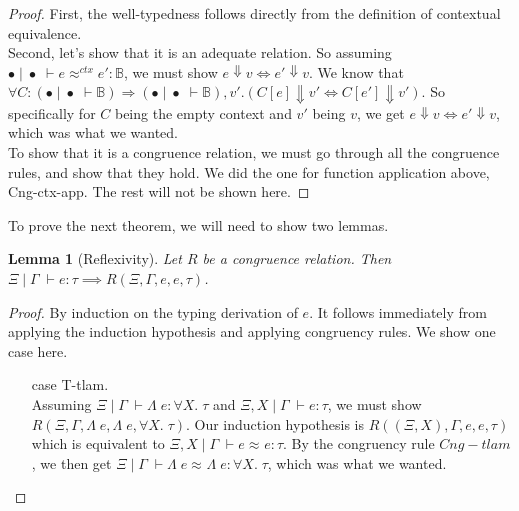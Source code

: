 \documentclass[twoside,11pt,openright]{report}
\newtheorem{lemma}[theorem]{Lemma}
\theoremstyle{definition}
\newcommand{\expr}{e}
\newcommand{\val}{v}
\newcommand{\Tvar}{X}
\newcommand{\Tlam}{\Lambda\;}
\newcommand{\ctx}{C}
\newcommand{\Tbool}{\mathbb{B}}
\newcommand{\Tall}[2]{\forall #1.\; #2}
\newcommand{\typ}{\tau}
\newcommand{\venv}{\Gamma}
\newcommand{\tenv}{\Xi}
\newcommand{\emptenv}{\bullet}
\newcommand{\empvenv}{\bullet}
\newcommand{\jdg}[4]{#1 \; | \; #2 \; \vdash #3 : #4}
\newcommand{\jdgType}[3]{#1 \; | \; #2 \; \vdash #3}
\newcommand{\jdgRel}[6]{#1 \; | \; #2 \; \vdash #3 \approx^{#4} #5 : #6}
\newcommand{\ctxRel}[5]{\jdgRel{#1}{#2}{#3}{ctx}{#4}{#5}}
\begin{document}
\begin{proof}
  First, the well-typedness follows directly from the definition of contextual equivalence.\\
  Second, let's show that it is an adequate relation. So assuming $\ctxRel{\emptenv}{\empvenv}{\expr}{\expr'}{\Tbool}$, we must show $\expr \Downarrow \val \iff \expr' \Downarrow \val$. We know that $\forall \ctx : (\jdgType{\emptenv}{\empvenv}{\Tbool}) \Rightarrow (\jdgType{\emptenv}{\empvenv}{\Tbool}), \val' . (\ctx[\expr] \Downarrow \val' \iff \ctx[\expr'] \Downarrow \val')$. So specifically for $C$ being the empty context and $\val'$ being $\val$, we get $\expr \Downarrow \val \iff \expr' \Downarrow \val$, which was what we wanted.\\
  To show that it is a congruence relation, we must go through all the congruence rules, and show that they hold. We did the one for function application above, Cng-ctx-app. The rest will not be shown here.
\end{proof}

To prove the next theorem, we will need to show two lemmas.
\begin{lemma}[Reflexivity]\label{lem:R_Cng_is_reflexive}
  Let $R$ be a congruence relation. Then $\jdg{\tenv}{\venv}{\expr}{\typ} \implies R(\tenv, \venv, \expr, \expr, \typ)$.
\end{lemma}
\begin{proof}
  By induction on the typing derivation of $\expr$. It follows immediately from applying the induction hypothesis and applying congruency rules. We show one case here.
  \begin{itemize}
    \item[case] T-tlam.\\
      Assuming $\jdg{\tenv}{\venv}{\Tlam \expr}{\Tall{\Tvar}{\typ}}$ and $\jdg{\tenv, \Tvar}{\venv}{\expr}{\typ}$, we must show $R(\tenv, \venv, \Tlam \expr, \Tlam \expr, \Tall{\Tvar}{\typ})$. Our induction hypothesis is $R((\tenv, \Tvar), \venv, \expr, \expr, \typ)$ which is equivalent to $\jdgRel{\tenv, \Tvar}{\venv}{\expr}{}{\expr}{\typ}$. By the congruency rule $Cng-tlam$, we then get $\jdgRel{\tenv}{\venv}{\Tlam \expr}{}{\Tlam \expr}{\Tall{\Tvar}{\typ}}$, which was what we wanted.
  \end{itemize}
\end{proof}
\end{document}
